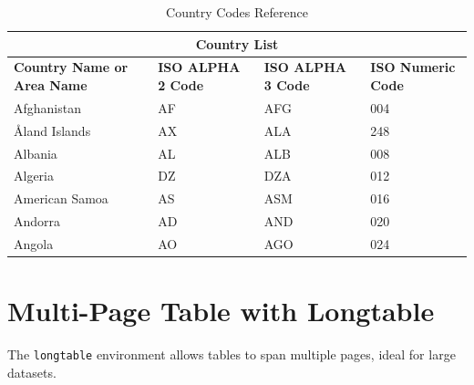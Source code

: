 \documentclass[12pt]{article}
\begin{document}
	\begin{table}[h!]
		\centering
		\caption{Country Codes Reference}
		\label{table:countries}
		\begin{tabular}{|p{3.5cm}|p{3.5cm}|p{3.5cm}|p{3.5cm}|}
			\hline
			\multicolumn{4}{|c|}{\textbf{Country List}} \\
			\hline
			\textbf{Country Name or Area Name} & \textbf{ISO ALPHA 2 Code} & \textbf{ISO ALPHA 3 Code} & \textbf{ISO Numeric Code} \\
			\hline
			Afghanistan & AF & AFG & 004 \\
			Åland Islands & AX & ALA & 248 \\
			Albania & AL & ALB & 008 \\
			Algeria & DZ & DZA & 012 \\
			American Samoa & AS & ASM & 016 \\
			Andorra & AD & AND & 020 \\
			Angola & AO & AGO & 024 \\
			\hline
		\end{tabular}
	\end{table}
	
	\section{Multi-Page Table with Longtable}
	The \texttt{longtable} environment allows tables to span multiple pages, ideal for large datasets.
	
\end{document}

